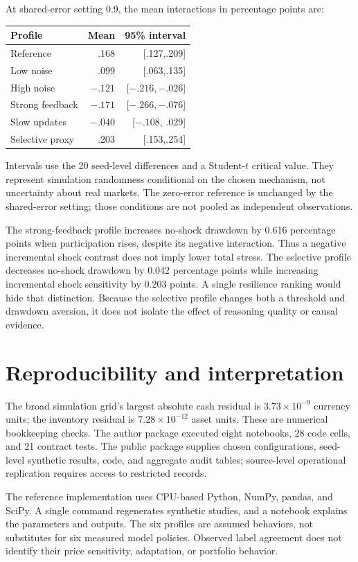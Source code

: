 \documentclass[10pt,letterpaper,twocolumn]{article}
\begin{document}
At shared-error setting 0.9, the mean interactions in percentage points are:
\begin{center}\small
\begin{tabular}{lrr}\toprule
Profile & Mean & 95\% interval\\\midrule
Reference & .168 & [.127,.209]\\
Low noise & .099 & [.063,.135]\\
High noise & $-.121$ & [$-.216,-.026$]\\
Strong feedback & $-.171$ & [$-.266,-.076$]\\
Slow updates & $-.040$ & [$-.108$, .029]\\
Selective proxy & .203 & [.153,.254]\\\bottomrule
\end{tabular}
\end{center}
Intervals use the 20 seed-level differences and a Student-$t$ critical value. They represent simulation randomness conditional on the chosen mechanism, not uncertainty about real markets. The zero-error reference is unchanged by the shared-error setting; those conditions are not pooled as independent observations.

The strong-feedback profile increases no-shock drawdown by 0.616 percentage points when participation rises, despite its negative interaction. Thus a negative incremental shock contrast does not imply lower total stress. The selective profile decreases no-shock drawdown by 0.042 percentage points while increasing incremental shock sensitivity by 0.203 points. A single resilience ranking would hide that distinction. Because the selective profile changes both a threshold and drawdown aversion, it does not isolate the effect of reasoning quality or causal evidence.

\section{Reproducibility and interpretation}
The broad simulation grid's largest absolute cash residual is $3.73\times10^{-9}$ currency units; the inventory residual is $7.28\times10^{-12}$ asset units. These are numerical bookkeeping checks. The author package executed eight notebooks, 28 code cells, and 21 contract tests. The public package supplies chosen configurations, seed-level synthetic results, code, and aggregate audit tables; source-level operational replication requires access to restricted records.

The reference implementation uses CPU-based Python, NumPy, pandas, and SciPy. A single command regenerates synthetic studies, and a notebook explains the parameters and outputs. The six profiles are assumed behaviors, not substitutes for six measured model policies. Observed label agreement does not identify their price sensitivity, adaptation, or portfolio behavior.
\end{document}
